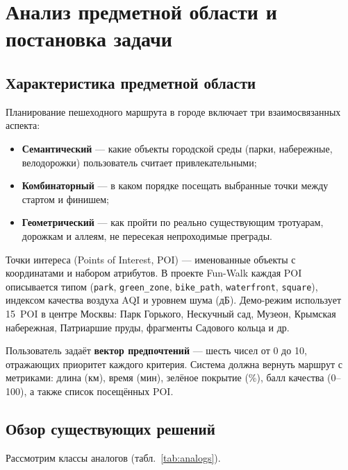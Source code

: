\chapter{Анализ предметной области и постановка задачи}
\label{ch:analysis}

\section{Характеристика предметной области}

Планирование пешеходного маршрута в городе включает три взаимосвязанных аспекта:
\begin{itemize}
  \item \textbf{Семантический} --- какие объекты городской среды (парки, набережные,
        велодорожки) пользователь считает привлекательными;
  \item \textbf{Комбинаторный} --- в каком порядке посещать выбранные точки между
        стартом и финишем;
  \item \textbf{Геометрический} --- как пройти по реально существующим тротуарам,
        дорожкам и аллеям, не пересекая непроходимые преграды.
\end{itemize}

Точки интереса (Points of Interest, POI) --- именованные объекты с координатами
и набором атрибутов. В проекте Fun-Walk каждая POI описывается типом
(\texttt{park}, \texttt{green\_zone}, \texttt{bike\_path}, \texttt{waterfront},
\texttt{square}), индексом качества воздуха AQI и уровнем шума (дБ). Демо-режим
использует 15~POI в центре Москвы: Парк Горького, Нескучный сад, Музеон, Крымская
набережная, Патриаршие пруды, фрагменты Садового кольца и др.

Пользователь задаёт \textbf{вектор предпочтений} --- шесть чисел от 0 до 10,
отражающих приоритет каждого критерия. Система должна вернуть маршрут с метриками:
длина (км), время (мин), зелёное покрытие (\%), балл качества (0--100), а также
список посещённых POI.

\section{Обзор существующих решений}

Рассмотрим классы аналогов (табл.~\ref{tab:analogs}).

